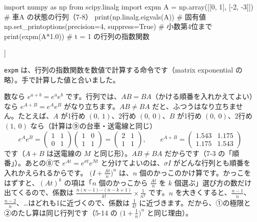 \begin{bkcode}[Python]
import numpy as np
from scipy.linalg import expm
A = np.array([[0, 1],
              [-2, -3]])        \# 車A の状態の行列（7-8）
print(np.linalg.eigvals(A))     \# 固有値
np.set\_printoptions(precision=4, suppress=True)  \# 小数第4位まで
print(expm(A*1.0))              \# t = 1 の行列の指数関数
\end{bkcode}
\begin{bkcodeout}[実行結果]
[-1.+0.j -2.+0.j]
[[ 0.6004  0.2325]
 [-0.4651 -0.0972]]
\end{bkcodeout}
\texttt{expm} は、行列の指数関数を数値で計算する命令です（matrix exponential の略）。手で計算した値と合いました。

\begin{seikaku}
数なら $e^{a+b}=e^ae^b$ です。行列では、$AB=BA$（かける順番を入れかえてよい）なら $e^{A+B}=e^Ae^B$ がなり立ちます。$AB\neq BA$ だと、ふつうはなり立ちません。たとえば、$A$ が1行め $(0,\ 1)$、2行め $(0,\ 0)$、$B$ が1行め $(0,\ 0)$、2行め $(1,\ 0)$ なら（計算は⑨の台車・送電線と同じ）
\[ e^Ae^B=\begin{pmatrix}1&1\\0&1\end{pmatrix}\begin{pmatrix}1&0\\1&1\end{pmatrix}=\begin{pmatrix}2&1\\1&1\end{pmatrix},\qquad e^{A+B}=\begin{pmatrix}1.543&1.175\\1.175&1.543\end{pmatrix} \]
です（$A+B$ は送電線の $M$ と同じ形）。$AB\neq BA$ だからです（7-3 の「順番」）。あとの⑧で $e^{At}=e^{\sigma t}e^{Nt}$ と分けてよいのは、$\sigma I$ がどんな行列とも順番を入れかえられるからです。
$\bigl(I+\frac{At}{n}\bigr)^n$ は、$n$ 個のかっこのかけ算です。かっこをはずすと、$(At)^k$ の項は「$n$ 個のかっこから $\frac{At}{n}$ を $k$ 個選ぶ」選び方の数だけ出てくるので、係数は $\frac{n(n-1)\cdots(n-k+1)}{k!}\times\frac{1}{n^k}$ です。$n$ を大きくすると、$\frac{n-1}{n}$、$\frac{n-2}{n}$、…はどれも1に近づくので、係数は $\frac{1}{k!}$ に近づきます。だから、①の極限と②のたし算は同じ行列です（5-14 の $\bigl(1+\frac1n\bigr)^n$ と同じ理由）。
\end{seikaku}

